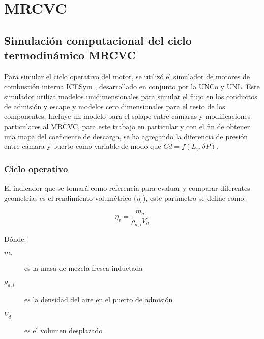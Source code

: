 \chapter{MRCVC}

\section{Simulación computacional del ciclo termodinámico MRCVC}

%
Para simular el ciclo operativo del motor, se utilizó el simulador de motores
de combustión interna ICESym \cite{icesym},
desarrollado en conjunto por la UNCo y UNL.
%
Este simulador utiliza modelos unidimensionales para simular el flujo en los
conductos de admisión y escape y modelos cero dimensionales para el resto de
los componentes.
%
Incluye un modelo para el solape entre cámaras \cite{lopez16} y modificaciones
particulares al MRCVC, para este trabajo en particular  y con el fin de obtener
una mapa del coeficiente de descarga, se ha agregando la diferencia de presión
entre cámara y puerto como variable de modo que $Cd = f(L_v, \delta P)$.

\subsection{Ciclo operativo}


El indicador que se tomará como referencia para evaluar y comparar diferentes
geometrías es el rendimiento volumétrico ($\eta_v$), este parámetro se define
como:

\begin{equation}
    \eta_v = \frac{m_a}{\rho_{a,i}V_d}
\end{equation}

Dónde:
%
\begin{description}
    \item[$m_i$] es la masa de mezcla fresca inductada
    \item[$\rho_{a,i}$] es la densidad del aire en el puerto de admisión
    \item[$V_d$] es el volumen desplazado
\end{description}

